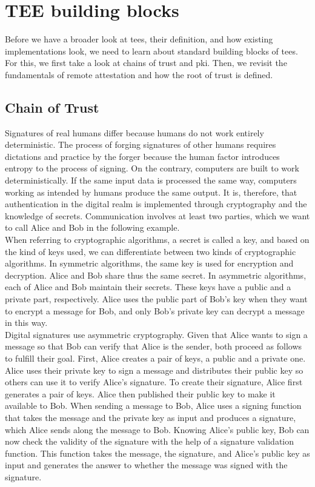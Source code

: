 \section{TEE building blocks}
\label{sec:20:building_blocks}
Before we have a broader look at \glspl{tee}, their definition, and how existing
implementations look, we need to learn about standard building blocks of
\glspl{tee}. For this, we first take a look at chains of trust and \gls{pki}.
Then, we revisit the fundamentals of remote attestation and how the root of
trust is defined.

\subsection{Chain of Trust}
\label{sec:20:chain_of_trust}
Signatures of real humans differ because humans do not work entirely
deterministic. The process of forging signatures of other humans requires
dictations and practice by the forger because the human factor introduces
entropy to the process of signing. On the contrary, computers are built to work
deterministically. If the same input data is processed the same way, computers
working as intended by humans produce the same output. It is, therefore, that
authentication in the digital realm is implemented through cryptography and the
knowledge of secrets. Communication involves at least two parties, which we want
to call Alice and Bob in the following example.\\

When referring to cryptographic algorithms, a secret is called a key, and based
on the kind of keys used, we can differentiate between two kinds of
cryptographic algorithms. In symmetric algorithms, the same key is used for
encryption and decryption. Alice and Bob share thus the same secret. In
asymmetric algorithms, each of Alice and Bob maintain their secrets. These keys
have a public and a private part, respectively. Alice uses the public part of
Bob's key when they want to encrypt a message for Bob, and only Bob's private
key can decrypt a message in this way.\\

Digital signatures use asymmetric cryptography. Given that Alice wants to sign a
message so that Bob can verify that Alice is the sender, both proceed as follows
to fulfill their goal. First, Alice creates a pair of keys, a public and a
private one. Alice uses their private key to sign a message and distributes
their public key so others can use it to verify Alice's signature. To create
their signature, Alice first generates a pair of keys. Alice then published
their public key to make it available to Bob. When sending a message to Bob,
Alice uses a signing function that takes the message and the private key as
input and produces a signature, which Alice sends along the message to Bob.
Knowing Alice's public key, Bob can now check the validity of the signature with
the help of a signature validation function. This function takes the message,
the signature, and Alice's public key as input and generates the answer to
whether the message was signed with the signature.\\

